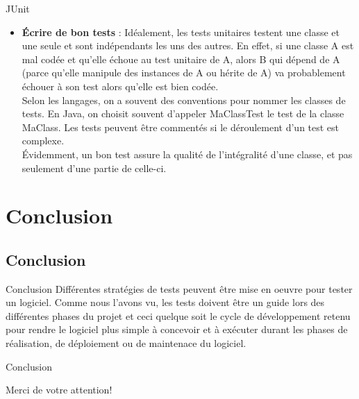\documentclass{beamer}
\begin{document}
        \begin{frame}{JUnit}   
         \begin{itemize}
        \item{{\bfseries Écrire de bon tests } : 
        Idéalement, les tests unitaires testent une classe et une seule et sont indépendants les uns des autres. En effet, si une classe A est mal codée et qu'elle échoue au test unitaire de A, alors B qui dépend de A (parce qu'elle manipule des instances de A ou hérite de A) va probablement échouer à son test alors qu'elle est bien codée.\\
        Selon les langages, on a souvent des conventions pour nommer les classes de tests. En Java, on choisit souvent d'appeler {\color{blue}MaClassTest} le test de la classe MaClass. Les tests peuvent être commentés si le déroulement d'un test est complexe.\\
        Évidemment, un bon test assure la qualité de l'intégralité d'une classe, et pas seulement d'une partie de celle-ci.}
    
   \end{itemize}
  
\end{frame}


\section{Conclusion}

\subsection{Conclusion}

\begin{frame}{Conclusion}
Différentes stratégies de tests peuvent être mise en oeuvre pour tester un logiciel.
Comme nous l'avons vu, les tests doivent être un guide lors des différentes phases du projet et ceci quelque soit le cycle de développement retenu pour rendre le logiciel plus simple à concevoir et à exécuter durant les phases de réalisation, de déploiement ou de maintenace du logiciel.


\end{frame}
\begin{frame}{Conclusion}
\begin{center}
Merci de votre attention!
\end{center}
\end{frame}
\end{document}
